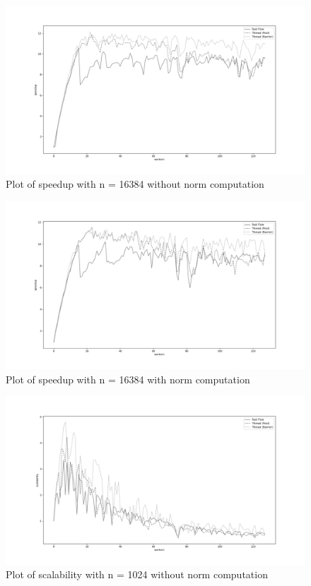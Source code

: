 \documentclass[12pt]{extarticle}
\begin{document}
\begin{figure}[H]
\centering
    \includegraphics[width=18cm, center]{./plots/speedup_16384_0.png}
    \caption{Plot of speedup with n = 16384 without norm computation}
\end{figure} 


\begin{figure}[H]
\centering
    \includegraphics[width=18cm, center]{./plots/speedup_16384_1.png}
    \caption{Plot of speedup with n = 16384 with norm computation}
\end{figure}


\begin{figure}[H]
\centering
    \includegraphics[width=18cm, center]{./plots/scalability_1024_0.png}
    \caption{Plot of scalability with n = 1024 without norm computation}
\end{figure}
\end{document}

